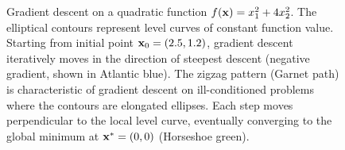 \begin{figure}[htbp]
\caption{Gradient descent on a quadratic function $f(\mathbf{x}) = x_1^2 + 4x_2^2$. The elliptical contours represent level curves of constant function value. Starting from initial point $\mathbf{x}_0 = (2.5, 1.2)$, gradient descent iteratively moves in the direction of steepest descent (negative gradient, shown in Atlantic blue). The zigzag pattern (Garnet path) is characteristic of gradient descent on ill-conditioned problems where the contours are elongated ellipses. Each step moves perpendicular to the local level curve, eventually converging to the global minimum at $\mathbf{x}^* = (0, 0)$ (Horseshoe green).}
\label{fig:contour_gradient}
\end{figure}
